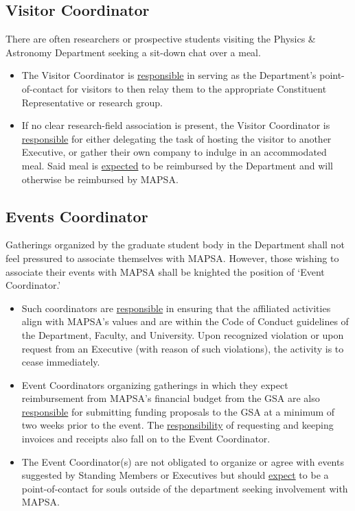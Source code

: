 \documentclass[8pt]{article}
\begin{document}
	\subsection{Visitor Coordinator}
	There are often researchers or prospective students visiting the Physics \& Astronomy Department seeking a sit-down chat over a meal. \begin{itemize}
		\item The Visitor Coordinator is \underline{responsible} in serving as the Department's point-of-contact for visitors to then relay them to the appropriate Constituent Representative or research group. 
		\item If no clear research-field association is present, the Visitor Coordinator is \underline{responsible} for either delegating the task of hosting the visitor to another Executive, or gather their own company to indulge in an accommodated meal. Said meal is \underline{expected} to be reimbursed by the Department and will otherwise be reimbursed by MAPSA.
	\end{itemize}
	\subsection{Events Coordinator}
	Gatherings organized by the graduate student body in the Department shall not feel pressured to associate themselves with MAPSA. However, those wishing to associate their events with MAPSA shall be knighted the position of `Event Coordinator.'
	\begin{itemize}
	\item Such coordinators are \underline{responsible} in ensuring that the affiliated activities align with MAPSA's values and are within the Code of Conduct guidelines of the Department, Faculty, and University. Upon recognized violation or upon request from an Executive (with reason of such violations), the activity is to cease immediately.
	\item Event Coordinators organizing gatherings in which they expect reimbursement from MAPSA's financial budget from the GSA are also \underline{responsible} for submitting funding proposals to the GSA at a minimum of two weeks prior to the event. The \underline{responsibility} of requesting and keeping invoices and receipts also fall on to the Event Coordinator.
	\item The Event Coordinator(s) are not obligated to organize or agree with events suggested by Standing Members or Executives but should \underline{expect} to be a point-of-contact for souls outside of the department seeking involvement with MAPSA.
	\end{itemize}
\end{document}
